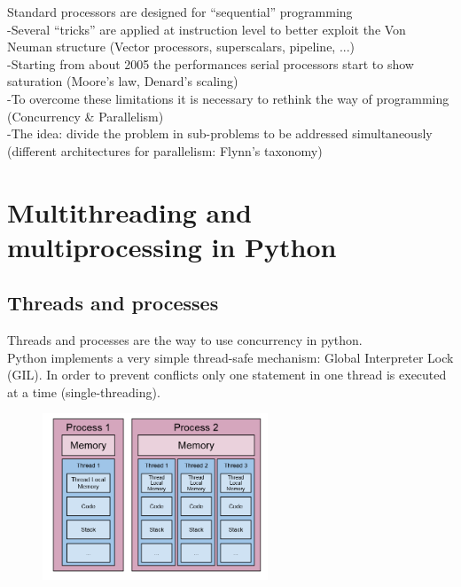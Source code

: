 \begin{tcolorbox}[width=\textwidth,colback={white},title={Recap: },colbacktitle=cyan,coltitle=black]

Standard processors are designed for “sequential” programming\\

-Several “tricks” are applied at instruction level to better exploit the Von Neuman structure (Vector processors, superscalars, pipeline, ...)\\

-Starting from about 2005 the performances serial processors start to show saturation (Moore’s law, Denard’s scaling)\\

-To overcome these limitations it is necessary to rethink the way of programming (Concurrency \& Parallelism)\\

-The idea: divide the problem in sub-problems to be addressed simultaneously (different architectures for parallelism: Flynn’s taxonomy)
\end{tcolorbox}


\newpage

\section{Multithreading and  multiprocessing in Python}

\subsection{Threads and processes}
Threads and processes are the way to use concurrency in python.\\ Python implements a very simple thread-safe mechanism: Global Interpreter Lock (GIL). In order to prevent conflicts only one statement in one thread is executed at a time (single-threading).\\


\begin{figure}[ht]
    \centering
    \includegraphics[width=0.6\textwidth]{figure_parallel/Thread_and_processes.png}\end{figure}
\FloatBarrier

